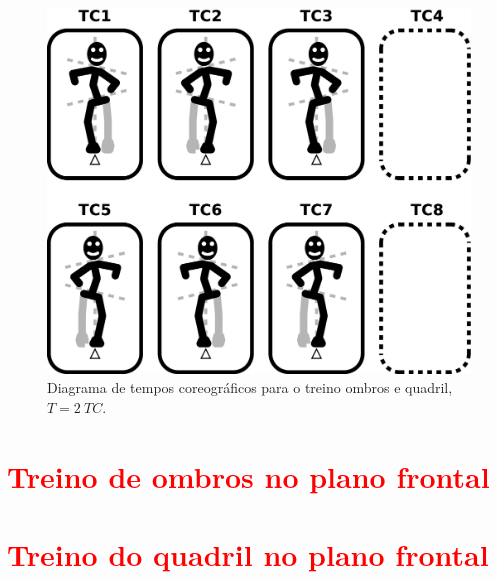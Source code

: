 \begin{figure}[!h]
  \centering
    \includegraphics[width=\textwidth]{chapters/cap-body-control/postura-ombro1.eps}
\caption{Diagrama de tempos coreográficos para o treino ombros e quadril, $T=2~TC$.}
\label{fig:pessoalombroquadril1}
\end{figure}

\section{\textcolor{red}{  Treino de ombros no plano frontal}}

\section{\textcolor{red}{  Treino do quadril no plano frontal}}


